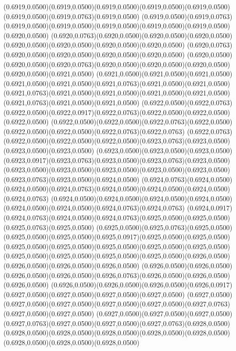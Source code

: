 (0.6919,0.0500)(0.6919,0.0500)(0.6919,0.0500)(0.6919,0.0500)(0.6919,0.0500)(0.6919,0.0500)(0.6919,0.0763)(0.6919,0.0500)
(0.6919,0.0500)(0.6919,0.0763)(0.6919,0.0500)(0.6919,0.0500)(0.6919,0.0500)(0.6919,0.0500)(0.6919,0.0500)(0.6920,0.0500)
(0.6920,0.0763)(0.6920,0.0500)(0.6920,0.0500)(0.6920,0.0500)(0.6920,0.0500)(0.6920,0.0500)(0.6920,0.0500)(0.6920,0.0500)
(0.6920,0.0763)(0.6920,0.0500)(0.6920,0.0500)(0.6920,0.0500)(0.6920,0.0500)
\PST@Solid(0.6920,0.0500)(0.6920,0.0500)(0.6920,0.0763)(0.6920,0.0500)(0.6920,0.0500)(0.6920,0.0500)(0.6920,0.0500)(0.6921,0.0500)
(0.6921,0.0500)(0.6921,0.0500)(0.6921,0.0500)(0.6921,0.0500)(0.6921,0.0500)(0.6921,0.0763)(0.6921,0.0500)(0.6921,0.0500)
(0.6921,0.0763)(0.6921,0.0500)(0.6921,0.0500)(0.6921,0.0500)(0.6921,0.0500)(0.6921,0.0763)(0.6921,0.0500)(0.6921,0.0500)
(0.6922,0.0500)(0.6922,0.0763)(0.6922,0.0500)(0.6922,0.0917)(0.6922,0.0763)(0.6922,0.0500)(0.6922,0.0500)(0.6922,0.0500)
(0.6922,0.0500)(0.6922,0.0500)(0.6922,0.0763)(0.6922,0.0500)(0.6922,0.0500)(0.6922,0.0500)(0.6922,0.0763)(0.6922,0.0763)
(0.6922,0.0763)(0.6922,0.0500)(0.6922,0.0500)(0.6922,0.0500)(0.6923,0.0763)(0.6923,0.0500)(0.6923,0.0500)(0.6923,0.0500)
(0.6923,0.0500)(0.6923,0.0500)(0.6923,0.0500)(0.6923,0.0917)(0.6923,0.0763)(0.6923,0.0500)(0.6923,0.0763)(0.6923,0.0500)
(0.6923,0.0500)(0.6923,0.0500)(0.6923,0.0500)(0.6923,0.0500)(0.6923,0.0500)(0.6923,0.0763)(0.6923,0.0500)(0.6924,0.0500)
(0.6924,0.0763)(0.6924,0.0500)(0.6924,0.0500)(0.6924,0.0763)(0.6924,0.0500)(0.6924,0.0500)(0.6924,0.0500)(0.6924,0.0763)
(0.6924,0.0500)(0.6924,0.0500)(0.6924,0.0500)(0.6924,0.0500)(0.6924,0.0500)(0.6924,0.0500)(0.6924,0.0763)(0.6924,0.0763)
(0.6924,0.0917)(0.6924,0.0763)(0.6924,0.0500)(0.6924,0.0763)(0.6925,0.0500)(0.6925,0.0500)(0.6925,0.0763)(0.6925,0.0500)
(0.6925,0.0500)(0.6925,0.0763)(0.6925,0.0500)(0.6925,0.0500)(0.6925,0.0500)(0.6925,0.0917)(0.6925,0.0500)(0.6925,0.0500)
(0.6925,0.0500)(0.6925,0.0500)(0.6925,0.0500)(0.6925,0.0500)(0.6925,0.0500)
\PST@Solid(0.6925,0.0500)(0.6925,0.0500)(0.6925,0.0500)(0.6925,0.0500)(0.6926,0.0500)(0.6926,0.0500)(0.6926,0.0500)(0.6926,0.0500)
(0.6926,0.0500)(0.6926,0.0500)(0.6926,0.0500)(0.6926,0.0500)(0.6926,0.0763)(0.6926,0.0500)(0.6926,0.0500)(0.6926,0.0500)
(0.6926,0.0500)(0.6926,0.0500)(0.6926,0.0500)(0.6926,0.0917)(0.6927,0.0500)(0.6927,0.0500)(0.6927,0.0500)(0.6927,0.0500)
(0.6927,0.0500)(0.6927,0.0500)(0.6927,0.0500)(0.6927,0.0500)(0.6927,0.0500)(0.6927,0.0763)(0.6927,0.0500)(0.6927,0.0500)
(0.6927,0.0500)(0.6927,0.0500)(0.6927,0.0500)(0.6927,0.0763)(0.6927,0.0500)(0.6927,0.0500)(0.6927,0.0763)(0.6928,0.0500)
(0.6928,0.0500)(0.6928,0.0500)(0.6928,0.0500)(0.6928,0.0500)(0.6928,0.0500)(0.6928,0.0500)(0.6928,0.0500)(0.6928,0.0500)
